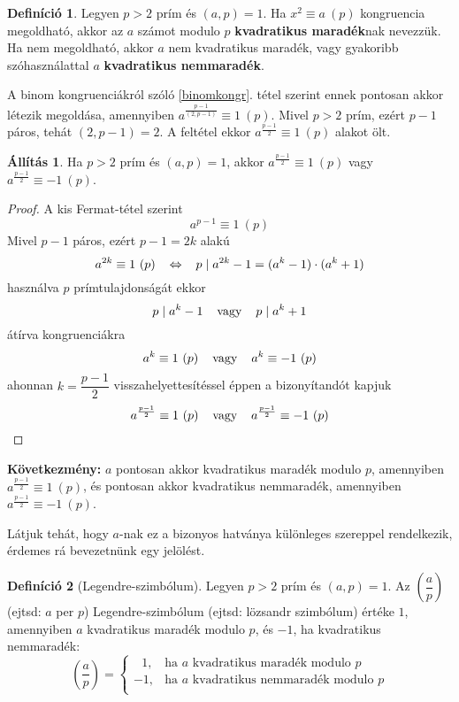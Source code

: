 \documentclass[12pt]{book}
\theoremstyle{plain} %
\theoremstyle{definition} %
\newtheorem{defi/}{Definíció}[section]
\newenvironment{defi}
  {\renewcommand{\qedsymbol}{$\clubsuit$}%
   \pushQED{\qed}\begin{defi/}}
  {\popQED\end{defi/}}
\newtheorem{all/}{Állítás}[section]
\newenvironment{all}
{\renewcommand{\qedsymbol}{$\clubsuit$}%
	\pushQED{\qed}\begin{all/}}
	{\popQED\end{all/}}
\theoremstyle{remark}
\renewcommand\qedsymbol{$\blacksquare$}
\numberwithin{equation}{section}  %
\begin{document}
	\begin{defi}
		Legyen $p>2$ prím és $(a,p)=1$. Ha $x^2\equiv a\ (p)$ kongruencia megoldható, akkor az $a$ számot modulo $p$ \textbf{kvadratikus maradék}nak nevezzük. Ha nem megoldható, akkor $a$ nem kvadratikus maradék, vagy gyakoribb szóhasználattal $a$ \textbf{kvadratikus nemmaradék}.
	\end{defi}
	
	A binom kongruenciákról szóló \ref{binomkongr}. tétel szerint ennek pontosan akkor létezik megoldása, amennyiben $a^{\frac{p-1}{(2,p-1)}} \equiv 1\ (p)$. Mivel $p>2$ prím, ezért $p-1$ páros, tehát $(2,p-1)=2$. A feltétel ekkor $a^{\frac{p-1}{2}} \equiv 1\ (p)$ alakot ölt.
	
	\begin{all}
		Ha $p>2$ prím és $(a,p)=1$, akkor $a^{\frac{p-1}{2}} \equiv 1\ (p)$ vagy $a^{\frac{p-1}{2}} \equiv -1\ (p)$.
	\end{all}

	\begin{proof}
		A kis Fermat-tétel szerint
		\[ a^{p-1} \equiv 1\ (p)  \]
		Mivel $p-1$ páros, ezért $p-1=2k$ alakú
		\[ a^{2k} \equiv 1\ (p) \hspace{3mm} \Leftrightarrow \hspace{3mm} p\mid a^{2k} - 1 = (a^k-1)\cdot (a^k+1) \]
		használva $p$ prímtulajdonságát ekkor
		\[ p\mid a^k-1 \hspace{4mm} \text{vagy} \hspace{4mm} p\mid a^k+1  \]
		átírva kongruenciákra
		\[ a^k\equiv 1\ (p) \hspace{4mm} \text{vagy} \hspace{4mm} a^k\equiv -1\ (p)  \]
		ahonnan $k=\dfrac{p-1}{2}$ visszahelyettesítéssel éppen a bizonyítandót kapjuk
		\[ a^{\frac{p-1}{2}} \equiv 1\ (p) \hspace{4mm} \text{vagy} \hspace{4mm} a^{\frac{p-1}{2}} \equiv - 1\ (p)  \]
	\end{proof}

	\textbf{Következmény:} $a$ pontosan akkor kvadratikus maradék modulo $p$, amennyiben $a^{\frac{p-1}{2}}\equiv 1\ (p)$, és pontosan akkor kvadratikus nemmaradék, amennyiben $a^{\frac{p-1}{2}}\equiv -1\ (p)$.
	
	Látjuk tehát, hogy $a$-nak ez a bizonyos hatványa különleges szereppel rendelkezik, érdemes rá bevezetnünk egy jelölést.
	
	\begin{defi}[Legendre-szimbólum]
		Legyen $p>2$ prím és $(a,p)=1$. Az $\left(\dfrac{a}{p}\right)$ (ejtsd: $a$ per $p$) Legendre-szimbólum (ejtsd: lözsandr szimbólum) értéke $1$, amennyiben $a$ kvadratikus maradék modulo $p$, és $-1$, ha kvadratikus nemmaradék:
		\[ \left(\dfrac{a}{p}\right) = \begin{cases}
		\ \ \ 1, & \text{ha $a$ kvadratikus maradék modulo $p$} \\
		-1, & \text{ha $a$ kvadratikus nemmaradék modulo $p$} \\
		\end{cases} \]
	\end{defi}
\end{document}
